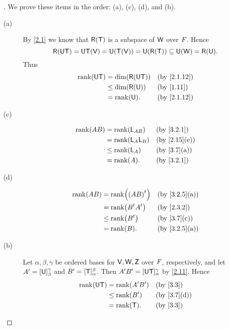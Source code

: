 \begin{proof}[]
  We prove these items in the order:
  (a), (c), (d), and (b).
  \begin{description}
    \item[(a)]
      By \cref{2.1} we know that \(\rg{\T}\) is a subspace of \(\mathsf{W}\) over \(\mathit{F}\).
      Hence
      \[
        \rg{\U \T} = \U \T(\V) = \U(\T(\V)) = \U(\rg{\T}) \subseteq \U(\W) = \rg{\U}.
      \]
      Thus
      \begin{align*}
        \rk{\U \T} & = \dim(\rg{\U \T}) &  & \by{2.1.12} \\
                   & \leq \dim(\rg{\U}) &  & \by{1.11}   \\
                   & = \rk{\U}.         &  & \by{2.1.12}
      \end{align*}
    \item[(c)]
      \begin{align*}
        \rk{AB} & = \rk{\L_{AB}}   &  & \by{3.2.1}   \\
                & = \rk{\L_A \L_B} &  & \by{2.15}[e] \\
                & \leq \rk{\L_A}   &  & \by{3.7}[a]  \\
                & = \rk{A}.        &  & \by{3.2.1}
      \end{align*}
    \item[(d)]
      \begin{align*}
        \rk{AB} & = \rk{\tp{(AB)}}     &  & \by{3.2.5}[a] \\
                & = \rk{\tp{B} \tp{A}} &  & \by{2.3.2}    \\
                & \leq \rk{\tp{B}}     &  & \by{3.7}[c]   \\
                & = \rk{B}.            &  & \by{3.2.5}[a]
      \end{align*}
    \item[(b)]
      Let \(\alpha, \beta, \gamma\) be ordered bases for \(\mathsf{V}, \mathsf{W}, \mathsf{Z}\) over \(\mathit{F}\), respectively, and let \(A' = [\mathsf{U}]_{\beta}^{\gamma}\) and \(B' = [\mathsf{T}]_{\alpha}^{\beta}\).
      Then \(A' B' = [\mathsf{U} \mathsf{T}]_{\alpha}^{\gamma}\) by \cref{2.11}.
      Hence
      \begin{align*}
        \rk{\U \T} & = \rk{A' B'} &  & \by{3.3}    \\
                   & \leq \rk{B'} &  & \by{3.7}[d] \\
                   & = \rk{\T}.   &  & \by{3.3}
      \end{align*}
  \end{description}
\end{proof}

